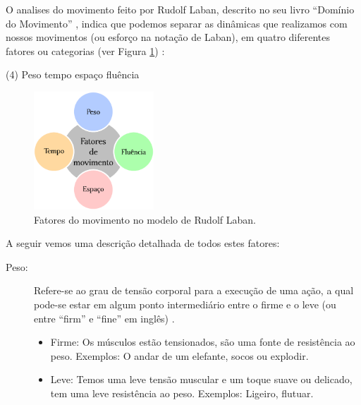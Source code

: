 O  analises do movimento feito por Rudolf Laban, 
descrito no seu livro ``Domínio do Movimento'' \cite[pp. 28]{laban1987dominio},
indica que podemos separar as dinâmicas que realizamos com nossos movimentos
(ou esforço na notação de Laban), 
em quatro diferentes fatores ou categorias (ver Figura \ref{fig:fatores:moviemnto:Laban})
\cite[pp. 142]{laban1987dominio} 
\cite[pp. 93]{maletic2011body}
\cite[pp. 30]{paine2014complete}
\cite[pp. 5]{carline2011lesson}: 
\begin{tasks}(4)
\task Peso
\task tempo 
\task espaço 
\task fluência
\end{tasks}

\begin{figure}
\centering

\vspace{-5pt}
\includegraphics[width=0.4\textwidth]{chapters/cap-musicalidade/elementos-musica-1.eps}
\vspace{-5pt}
\caption{Fatores do movimento no modelo de Rudolf Laban.}
\vspace{-10pt}
\label{fig:fatores:moviemnto:Laban}
\end{figure}
A seguir vemos uma descrição detalhada de todos estes fatores:\\
\begin{description}
\item[Peso:]
Refere-se ao grau de tensão corporal para a execução de uma ação, 
a qual pode-se estar em algum ponto intermediário entre o firme e o leve 
(ou entre ``firm'' e ``fine'' em inglês) 
\cite[pp. 137, 143]{laban1987dominio}  \cite[pp. 5]{carline2011lesson} \cite[pp. 28]{elementosdanca2017}. 
\begin{itemize}
\item Firme: Os músculos estão tensionados, são uma fonte de resistência ao peso. Exemplos: O andar de um elefante, socos ou explodir.
\item Leve: Temos uma leve tensão muscular e um toque suave ou delicado,
tem uma leve resistência ao peso.  Exemplos: Ligeiro, flutuar.
\end{itemize}~
\end{description}

